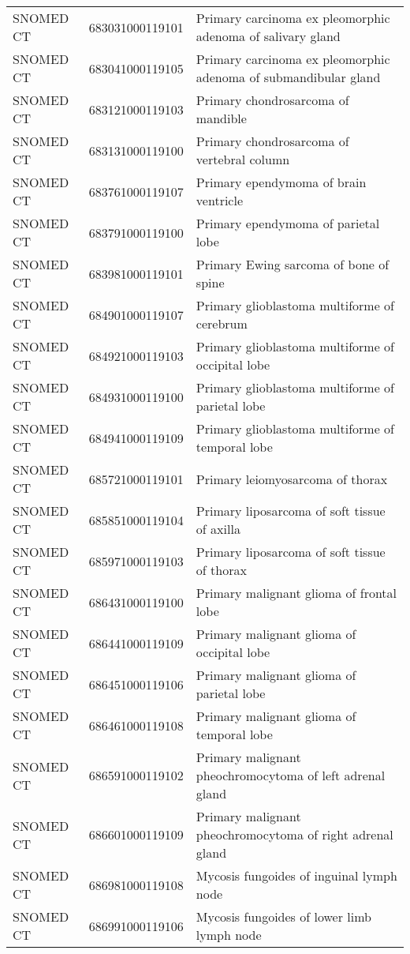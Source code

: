 \begin{longtable}{p{}p{}p{}}
  SNOMED CT & 683031000119101 & Primary carcinoma ex pleomorphic adenoma of salivary gland \\ 
  SNOMED CT & 683041000119105 & Primary carcinoma ex pleomorphic adenoma of submandibular gland \\ 
  SNOMED CT & 683121000119103 & Primary chondrosarcoma of mandible \\ 
  SNOMED CT & 683131000119100 & Primary chondrosarcoma of vertebral column \\ 
  SNOMED CT & 683761000119107 & Primary ependymoma of brain ventricle \\ 
  SNOMED CT & 683791000119100 & Primary ependymoma of parietal lobe \\ 
  SNOMED CT & 683981000119101 & Primary Ewing sarcoma of bone of spine \\ 
  SNOMED CT & 684901000119107 & Primary glioblastoma multiforme of cerebrum \\ 
  SNOMED CT & 684921000119103 & Primary glioblastoma multiforme of occipital lobe \\ 
  SNOMED CT & 684931000119100 & Primary glioblastoma multiforme of parietal lobe \\ 
  SNOMED CT & 684941000119109 & Primary glioblastoma multiforme of temporal lobe \\ 
  SNOMED CT & 685721000119101 & Primary leiomyosarcoma of thorax \\ 
  SNOMED CT & 685851000119104 & Primary liposarcoma of soft tissue of axilla \\ 
  SNOMED CT & 685971000119103 & Primary liposarcoma of soft tissue of thorax \\ 
  SNOMED CT & 686431000119100 & Primary malignant glioma of frontal lobe \\ 
  SNOMED CT & 686441000119109 & Primary malignant glioma of occipital lobe \\ 
  SNOMED CT & 686451000119106 & Primary malignant glioma of parietal lobe \\ 
  SNOMED CT & 686461000119108 & Primary malignant glioma of temporal lobe \\ 
  SNOMED CT & 686591000119102 & Primary malignant pheochromocytoma of left adrenal gland \\ 
  SNOMED CT & 686601000119109 & Primary malignant pheochromocytoma of right adrenal gland \\ 
  SNOMED CT & 686981000119108 & Mycosis fungoides of inguinal lymph node \\ 
  SNOMED CT & 686991000119106 & Mycosis fungoides of lower limb lymph node \\ 

\end{longtable}

